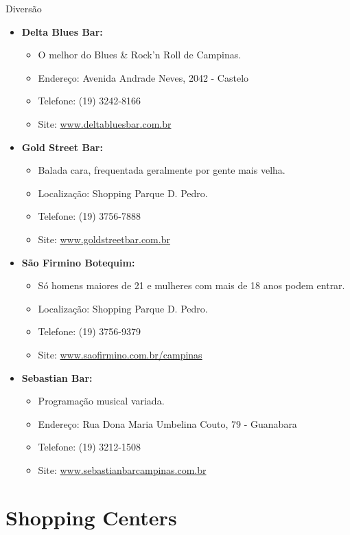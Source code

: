 \begin{story}{Diversão}
\begin{itemize}
\item \textbf{Delta Blues Bar:}
\begin{itemize}
\item O melhor do Blues \& Rock'n Roll de Campinas.
\item Endereço: Avenida Andrade Neves, 2042 - Castelo
\item Telefone: (19) 3242-8166
\item Site: \url{www.deltabluesbar.com.br}
\end{itemize}

\item \textbf{Gold Street Bar:}
\begin{itemize}
\item Balada cara, frequentada geralmente por gente mais velha.
\item Localização: Shopping Parque D. Pedro.
\item Telefone: (19) 3756-7888
\item Site: \url{www.goldstreetbar.com.br}
\end{itemize}

\item \textbf{São Firmino Botequim:}
\begin{itemize}
\item Só homens maiores de 21 e mulheres com mais de 18 anos podem entrar.
\item Localização: Shopping Parque D. Pedro.
\item Telefone: (19) 3756-9379
\item Site: \url{www.saofirmino.com.br/campinas}
\end{itemize}

\item \textbf{Sebastian Bar:}
\begin{itemize}
\item Programação musical variada.
\item Endereço: Rua Dona Maria Umbelina Couto, 79 - Guanabara
\item Telefone: (19) 3212-1508
\item Site: \url{www.sebastianbarcampinas.com.br}
\end{itemize}

\end{itemize}

\section*{Shopping Centers}


\end{story}
